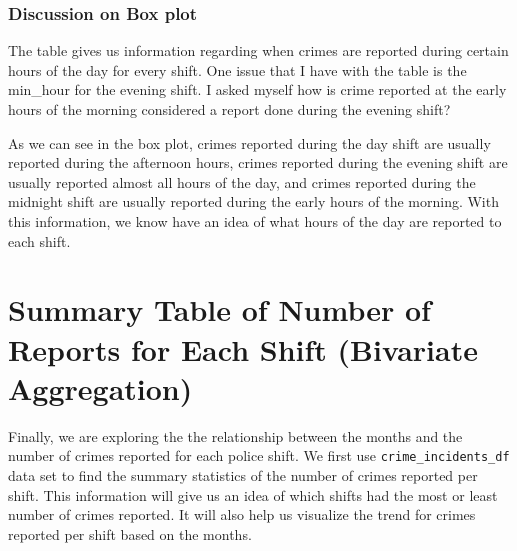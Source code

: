 \documentclass[
]{article}
\begin{document}
\subsubsection{Discussion on Box plot}\label{discussion-on-box-plot}

The table gives us information regarding when crimes are reported during
certain hours of the day for every shift. One issue that I have with the
table is the min\_hour for the evening shift. I asked myself how is
crime reported at the early hours of the morning considered a report
done during the evening shift?

As we can see in the box plot, crimes reported during the day shift are
usually reported during the afternoon hours, crimes reported during the
evening shift are usually reported almost all hours of the day, and
crimes reported during the midnight shift are usually reported during
the early hours of the morning. With this information, we know have an
idea of what hours of the day are reported to each shift.

\section{Summary Table of Number of Reports for Each Shift (Bivariate
Aggregation)}\label{summary-table-of-number-of-reports-for-each-shift-bivariate-aggregation}

Finally, we are exploring the the relationship between the months and
the number of crimes reported for each police shift. We first use
\texttt{crime\_incidents\_df} data set to find the summary statistics of
the number of crimes reported per shift. This information will give us
an idea of which shifts had the most or least number of crimes reported.
It will also help us visualize the trend for crimes reported per shift
based on the months.
\end{document}
